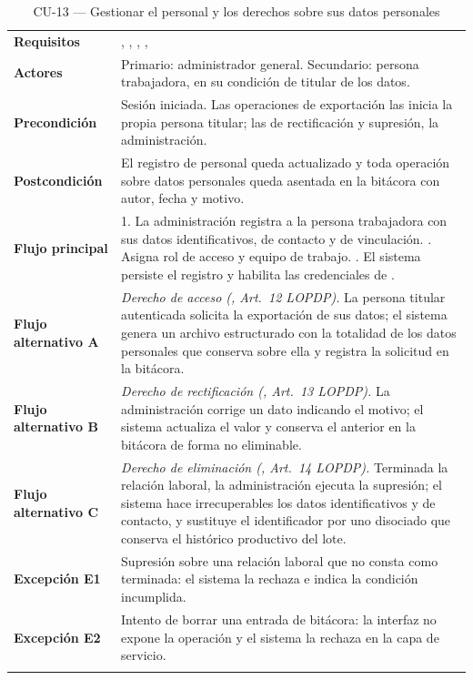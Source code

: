 \begin{longtable}{|L{3.4cm}|L{12.0cm}|}
\hline
{}\\
\hline
\textbf{Requisitos} & , , , ,  \\ \hline
\textbf{Actores} & Primario: administrador general. Secundario: persona trabajadora, en su condición de titular de los datos. \\ \hline
\textbf{Precondición} & Sesión iniciada. Las operaciones de exportación las inicia la propia persona titular; las de rectificación y supresión, la administración. \\ \hline
\textbf{Postcondición} & El registro de personal queda actualizado y toda operación sobre datos personales queda asentada en la bitácora con autor, fecha y motivo. \\ \hline
\textbf{Flujo principal} & 1. La administración registra a la persona trabajadora con sus datos identificativos, de contacto y de vinculación. . Asigna rol de acceso y equipo de trabajo. . El sistema persiste el registro y habilita las credenciales de . \\ \hline
\textbf{Flujo alternativo A} & \emph{Derecho de acceso (, Art.~12 LOPDP).} La persona titular autenticada solicita la exportación de sus datos; el sistema genera un archivo estructurado con la totalidad de los datos personales que conserva sobre ella y registra la solicitud en la bitácora. \\ \hline
\textbf{Flujo alternativo B} & \emph{Derecho de rectificación (, Art.~13 LOPDP).} La administración corrige un dato indicando el motivo; el sistema actualiza el valor y conserva el anterior en la bitácora de forma no eliminable. \\ \hline
\textbf{Flujo alternativo C} & \emph{Derecho de eliminación (, Art.~14 LOPDP).} Terminada la relación laboral, la administración ejecuta la supresión; el sistema hace irrecuperables los datos identificativos y de contacto, y sustituye el identificador por uno disociado que conserva el histórico productivo del lote. \\ \hline
\textbf{Excepción E1} & Supresión sobre una relación laboral que no consta como terminada: el sistema la rechaza e indica la condición incumplida. \\ \hline
\textbf{Excepción E2} & Intento de borrar una entrada de bitácora: la interfaz no expone la operación y el sistema la rechaza en la capa de servicio. \\ \hline
\caption{CU-13 --- Gestionar el personal y los derechos sobre sus datos personales}
\end{longtable}

